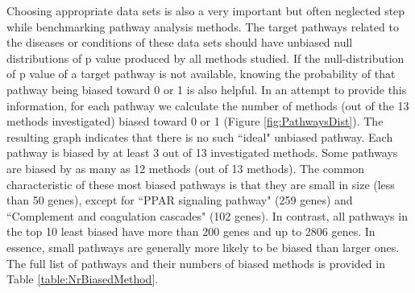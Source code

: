\documentclass[Minh_PhD_thesis.tex]{subfiles}
\begin{document}
Choosing appropriate data sets is also a very important but often neglected step while benchmarking pathway analysis methods. 
The target pathways related to the diseases or conditions of these data sets should have unbiased null distributions of p value produced by all methods studied. If the null-distribution of p value of a target pathway is not available, knowing the probability of that pathway being biased toward 0 or 1 is also helpful. 
In an attempt to provide this information, for each pathway we calculate the number of methods (out of the 13 methods investigated) biased toward 0 or 1 (Figure \ref{fig:PathwaysDist}). 
The resulting graph indicates that there is no such ``ideal" unbiased pathway.
Each pathway is biased by at least 3 out of 13 investigated methods. 
Some pathways are biased by as many as 12 methods (out of 13 methods).
The common characteristic of these most biased pathways is that they are small in size (less than 50 genes), except for ``PPAR signaling pathway" (259 genes) and ``Complement and coagulation cascades" (102 genes).
In contrast, all pathways in the top 10 least biased have more than 200 genes and up to 2806 genes. In essence, small pathways are generally more likely to be biased than larger ones.
The full list of pathways and their numbers of biased methods is provided in Table \ref{table:NrBiasedMethod}.
\end{document}
